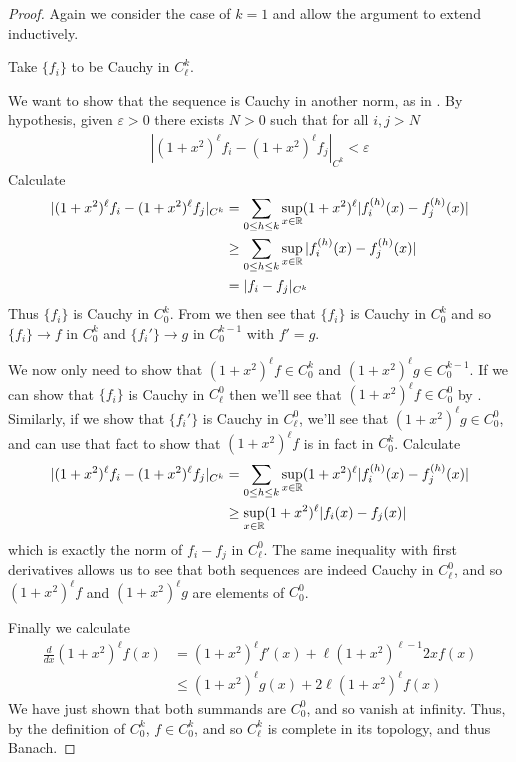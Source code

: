       \begin{proof}
        Again we consider the case of $k=1$ and allow the argument to extend inductively.

        Take $\{f_i\}$ to be Cauchy in $C^k_\ell$.

        We want to show that the sequence is Cauchy in another norm, as in .
        By hypothesis, given $\varepsilon>0$ there exists $N>0$ such that for all $i,j>N$
        \begin{align*}
          |(1+x^2)^\ell f_i - (1+x^2)^\ell f_j|_{C^k} < \varepsilon
        \end{align*}
        Calculate
        \begin{align*}
          |(1+x^2)^\ell f_i - (1+x^2)^\ell f_j|_{C^k}
          &= \sum_{0\le h\le k}\sup_{x\in\mathbb{R}}(1+x^2)^\ell|f_i^{(h)}(x)-f_j^{(h)}(x)|\\
          &\ge \sum_{0\le h\le k}\sup_{x\in\mathbb{R}}|f_i^{(h)}(x)-f_j^{(h)}(x)|\\
          &= |f_i-f_j|_{C^k}
        \end{align*}
        Thus $\{f_i\}$ is Cauchy in $C^k_0$.
        From  we then see that $\{f_i\}$ is Cauchy in $C^k_0$ and so $\{f_i\}\rightarrow f$ in $C^k_0$ and $\{f_i'\}\rightarrow g$ in $C^{k-1}_0$ with $f'=g$.

        We now only need to show that $(1+x^2)^\ell f\in C^k_0$ and $(1+x^2)^\ell g\in C^{k-1}_0$.
        If we can show that $\{f_i\}$ is Cauchy in $C^0_\ell$ then we'll see that $(1+x^2)^\ell f\in C^0_0$ by .
        Similarly, if we show that $\{f_i'\}$ is Cauchy in $C^0_\ell$, we'll see that $(1+x^2)^\ell g\in C^0_0$, and can use that fact to show that $(1+x^2)^\ell f$ is in fact in $C^k_0$.
        Calculate
        \begin{align*}
          |(1+x^2)^\ell f_i - (1+x^2)^\ell f_j|_{C^k}
          &= \sum_{0\le h\le k}\sup_{x\in\mathbb{R}}(1+x^2)^\ell|f_i^{(h)}(x)-f_j^{(h)}(x)|\\
          &\ge \sup_{x\in\mathbb{R}}(1+x^2)^\ell|f_i(x)-f_j(x)|
        \end{align*}
        which is exactly the norm of $f_i-f_j$ in $C^0_\ell$.
        The same inequality with first derivatives allows us to see that both sequences are indeed Cauchy in $C^0_\ell$, and so $(1+x^2)^\ell f$ and $(1+x^2)^\ell g$ are elements of $C^0_0$.

        Finally we calculate
        \begin{align*}
          \frac{d}{dx}(1+x^2)^\ell f(x)
          &= (1+x^2)^\ell f'(x) + \ell(1+x^2)^{\ell-1}2xf(x)\\
          &\le (1+x^2)^\ell g(x) + 2\ell(1+x^2)^\ell f(x)
        \end{align*}
        We have just shown that both summands are $C^0_0$, and so vanish at infinity.
        Thus, by the definition of $C^k_0$, $f\in C^k_0$, and so $C^k_\ell$ is complete in its topology, and thus Banach.
      \end{proof}

